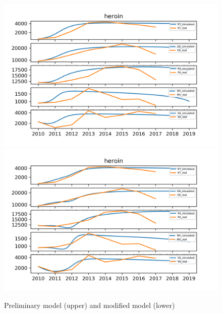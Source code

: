 \documentclass[12pt]{article}
\begin{document}
\begin{figure}[!htbp]
\small
\centering
\includegraphics[width=16cm]{Fig/heroin_states_simul.png}
\includegraphics[width=16cm]{Fig/heroin_states_simul_modified.png}
\caption{Preliminary model (upper) and modified model (lower)}
\end{figure}
\end{document}
